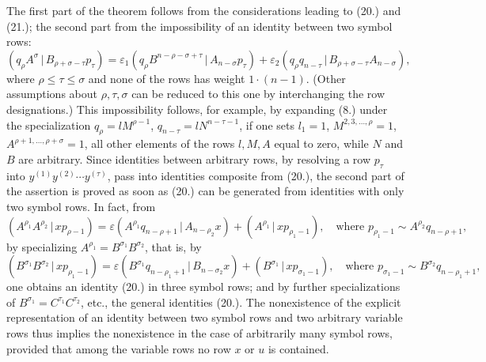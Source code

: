 \documentclass[11pt]{article}
\providecommand{\pair}[2]{(#1\,|\,#2)}
\providecommand{\eps}{\varepsilon}
\begin{document}
The first part of the theorem follows from the considerations leading to (20.) and (21.); the second part from the impossibility of an identity between two symbol rows:
\[
\pair{q_\rho A^\sigma}{B_{\rho+\sigma-\tau}p_\tau}
=\eps_1\pair{q_\rho B^{n-\rho-\sigma+\tau}}{A_{n-\sigma}p_\tau}
+\eps_2\pair{q_\rho q_{n-\tau}}{B_{\rho+\sigma-\tau}A_{n-\sigma}},
\]
where $\rho\le\tau\le\sigma$ and none of the rows has weight $1\cdot(n-1)$. (Other assumptions about $\rho,\tau,\sigma$ can be reduced to this one by interchanging the row designations.) This impossibility follows, for example, by expanding (8.) under the specialization $q_\rho=lM^{\rho-1}$, $q_{n-\tau}=lN^{n-\tau-1}$, if one sets $l_1=1$, $M^{2,3,\ldots,\rho}=1$, $A^{\rho+1,\ldots,\rho+\sigma}=1$, all other elements of the rows $l,M,A$ equal to zero, while $N$ and $B$ are arbitrary. Since identities between arbitrary rows, by resolving a row $p_\tau$ into $y^{(1)}y^{(2)}\cdots y^{(\tau)}$, pass into identities composite from (20.), the second part of the assertion is proved as soon as (20.) can be generated from identities with only two symbol rows. In fact, from
\begin{equation}
\pair{A^{\rho_1}A^{\rho_2}}{xp_{\rho-1}}
=\eps\pair{A^{\rho_1}q_{n-\rho+1}}{A_{n-\rho_2}x}
+\pair{A^{\rho_1}}{xp_{\rho_1-1}},
\quad \text{where }p_{\rho_1-1}\sim A^{\rho_2}q_{n-\rho+1},
\tag{20a}
\end{equation}
by specializing $A^{\rho_1}=B^{\sigma_1}B^{\sigma_2}$, that is, by
\[
\pair{B^{\sigma_1}B^{\sigma_2}}{xp_{\rho_1-1}}
=\eps\pair{B^{\sigma_1}q_{n-\rho_1+1}}{B_{n-\sigma_2}x}
+\pair{B^{\sigma_1}}{xp_{\sigma_1-1}},
\quad \text{where } p_{\sigma_1-1}\sim B^{\sigma_2}q_{n-\rho_1+1},
\]
one obtains an identity (20.) in three symbol rows; and by further specializations of $B^{\sigma_1}=C^{\tau_1}C^{\tau_2}$, etc., the general identities (20.). The nonexistence of the explicit representation of an identity between two symbol rows and two arbitrary variable rows thus implies the nonexistence in the case of arbitrarily many symbol rows, provided that among the variable rows no row $x$ or $u$ is contained.

\clearpage
\end{document}
